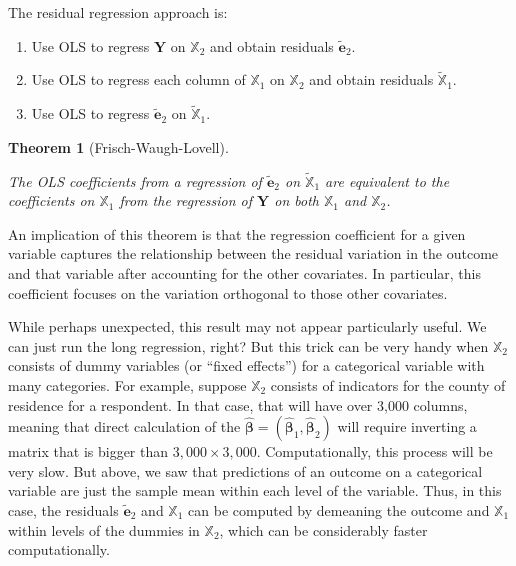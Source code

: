 \documentclass[
  13pt,
  letterpaper,
  DIV=11,
  numbers=noendperiod]{scrreprt}
\providecommand{\tightlist}{%
  \setlength{\itemsep}{0pt}\setlength{\parskip}{0pt}}\usepackage{longtable,booktabs,array}
\newcommand{\mb}{\symbf}
\newcommand{\Xmat}{\mathbb{X}}
\newcommand{\bhat}{\widehat{\mb{\beta}}}
\theoremstyle{plain}
\newtheorem{theorem}{Theorem}[chapter]
\theoremstyle{definition}
\theoremstyle{definition}
\theoremstyle{remark}
\begin{document}
\begin{tcolorbox}[enhanced jigsaw, title=\textcolor{quarto-callout-note-color}{\faInfo}\hspace{0.5em}{Residual regression approach}, breakable, colbacktitle=quarto-callout-note-color!10!white, toptitle=1mm, colback=white, arc=.35mm, left=2mm, opacityback=0, titlerule=0mm, colframe=quarto-callout-note-color-frame, leftrule=.75mm, coltitle=black, opacitybacktitle=0.6, bottomtitle=1mm, rightrule=.15mm, bottomrule=.15mm, toprule=.15mm]

The residual regression approach is:

\begin{enumerate}
\def\labelenumi{\arabic{enumi}.}
\tightlist
\item
  Use OLS to regress \(\mb{Y}\) on \(\Xmat_2\) and obtain residuals
  \(\widetilde{\mb{e}}_2\).
\item
  Use OLS to regress each column of \(\Xmat_1\) on \(\Xmat_2\) and
  obtain residuals \(\widetilde{\Xmat}_1\).
\item
  Use OLS to regress \(\widetilde{\mb{e}}_{2}\) on
  \(\widetilde{\Xmat}_1\).
\end{enumerate}

\end{tcolorbox}

\begin{theorem}[Frisch-Waugh-Lovell]\protect\hypertarget{thm-fwl}{}\label{thm-fwl}

The OLS coefficients from a regression of \(\widetilde{\mb{e}}_{2}\) on
\(\widetilde{\Xmat}_1\) are equivalent to the coefficients on
\(\Xmat_{1}\) from the regression of \(\mb{Y}\) on both \(\Xmat_{1}\)
and \(\Xmat_2\).

\end{theorem}

An implication of this theorem is that the regression coefficient for a
given variable captures the relationship between the residual variation
in the outcome and that variable after accounting for the other
covariates. In particular, this coefficient focuses on the variation
orthogonal to those other covariates.

While perhaps unexpected, this result may not appear particularly
useful. We can just run the long regression, right? But this trick can
be very handy when \(\Xmat_2\) consists of dummy variables (or ``fixed
effects'') for a categorical variable with many categories. For example,
suppose \(\Xmat_2\) consists of indicators for the county of residence
for a respondent. In that case, that will have over 3,000 columns,
meaning that direct calculation of the
\(\bhat = (\bhat_{1}, \bhat_{2})\) will require inverting a matrix that
is bigger than \(3,000 \times 3,000\). Computationally, this process
will be very slow. But above, we saw that predictions of an outcome on a
categorical variable are just the sample mean within each level of the
variable. Thus, in this case, the residuals \(\widetilde{\mb{e}}_2\) and
\(\Xmat_1\) can be computed by demeaning the outcome and \(\Xmat_1\)
within levels of the dummies in \(\Xmat_2\), which can be considerably
faster computationally.
\end{document}
